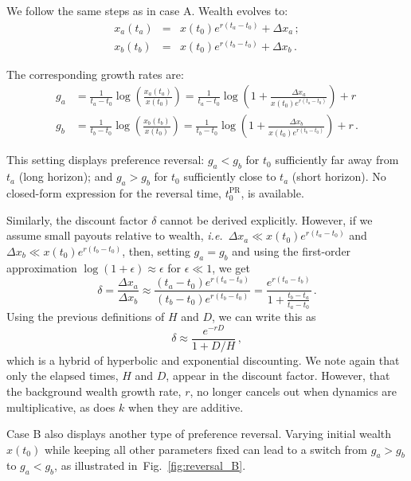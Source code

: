 \documentclass[11pt]{article}
\newcommand{\elabel}[1]{\label{eq:#1}}
\newcommand{\ie}{{\it i.e.}\ }
\newcommand{\fref}[1]{Fig.~\ref{fig:#1}}
\newcommand{\be}{\begin{equation}}
\newcommand{\ee}{\end{equation}}
\newcommand{\bea}{\begin{eqnarray}}
\newcommand{\eea}{\end{eqnarray}}
\newcommand{\Dx}{\Delta x}
\newcommand{\del}{D}
\newcommand{\hor}{H}
\numberwithin{equation}{section}
\begin{document}
We follow the same steps as in case A. Wealth evolves to:
\bea
x_a\left(t_a\right) &=& x\left(t_0\right) e^{r(t_a-t_0)} + \Dx_a\,;\\
x_b\left(t_b\right) &=& x\left(t_0\right) e^{r(t_b-t_0)} + \Dx_b\,.
\eea

The corresponding growth rates are:
\bea
g_a &= \frac{1}{t_a-t_0} \log{\left(\frac{x_a\left(t_a\right)}{x\left(t_0\right)}\right)} = \frac{1}{t_a-t_0}\log{\left(1 + \frac{\Dx_a}{x\left(t_0\right)e^{r(t_a-t_0)}}\right)} + r \elabel{ga_B}\\
g_b &= \frac{1}{t_b-t_0} \log{\left(\frac{x_b\left(t_b\right)}{x\left(t_0\right)}\right)} = \frac{1}{t_b-t_0}\log{\left(1 + \frac{\Dx_b}{x\left(t_0\right)e^{r(t_b-t_0)}}\right)} + r\,.\elabel{gb_B}
\eea

This setting displays preference reversal: $g_a<g_b$ for $t_0$ sufficiently far away from $t_a$ (long horizon); and $g_a>g_b$ for $t_0$ sufficiently close to $t_a$ (short horizon). No closed-form expression for the reversal time, $t_0^\text{PR}$, is available.

Similarly, the discount factor $\delta$ cannot be derived explicitly. However, if we assume small payouts relative to wealth, \ie $\Dx_a \ll x\left(t_0\right)e^{r(t_a-t_0)}$ and $\Dx_b \ll x\left(t_0\right)e^{r(t_b-t_0)}$, then, setting $g_a=g_b$ and using the first-order approximation $\log(1+\epsilon)\approx\epsilon$ for $\epsilon\ll1$, we get
\be
\delta = \frac{\Dx_a}{\Dx_b} \approx \frac{(t_a-t_0)e^{r(t_a-t_0)}}{(t_b-t_0)e^{r(t_b-t_0)}} =
\frac{e^{r(t_a-t_b)}}{1+\frac{t_b-t_a}{t_a-t_0}}\,.
\ee
Using the previous definitions of $\hor$ and $\del$, we can write this as
\be
\delta \approx \frac{e^{-r\del}}{1+\del/\hor}\,,
\ee
which is a hybrid of hyperbolic and exponential discounting. We note again that only the elapsed times, $\hor$ and $\del$, appear in the discount factor. However, that the background wealth growth rate, $r$, no longer cancels out when dynamics are multiplicative, as does $k$ when they are additive.

Case B also displays another type of preference reversal. Varying initial wealth $x(t_0)$ while keeping all other parameters fixed can lead to a switch from $g_a>g_b$ to $g_a<g_b$, as illustrated in~\fref{reversal_B}.
\end{document}
